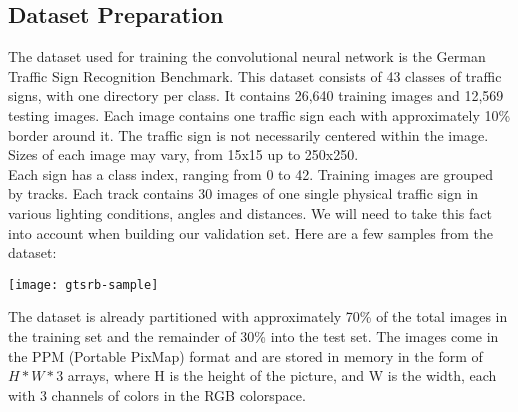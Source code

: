 \begin{center}
	\chapter{Dataset Preparation}
\end{center}

The dataset used for training the convolutional neural network is the German Traffic Sign Recognition Benchmark.\cite{GTSRB}
This dataset consists of 43 classes of traffic signs, with one directory per class. It contains 26,640 training images and 12,569 testing images. Each image contains one traffic sign each with approximately 10\% border around it. The traffic sign is not necessarily centered within the image. Sizes of each image may vary, from 15x15 up to 250x250.\\
Each sign has a class index, ranging from 0 to 42. Training images are grouped by tracks. Each track contains 30 images of one single physical traffic sign in various lighting conditions, angles and distances. We will need to take this fact into account when building our validation set.
Here are a few samples from the dataset:
\begin{center}
\texttt{[image: gtsrb-sample]}
\end{center}
The dataset is already partitioned with approximately 70\% of the total images in the training set and the remainder of 30\% into the test set. 
The images come in the PPM (Portable PixMap) format and are stored in memory in the form of $H*W*3$ arrays, where H is the height of the picture, and W is the width, each with 3 channels of colors in the RGB colorspace.

